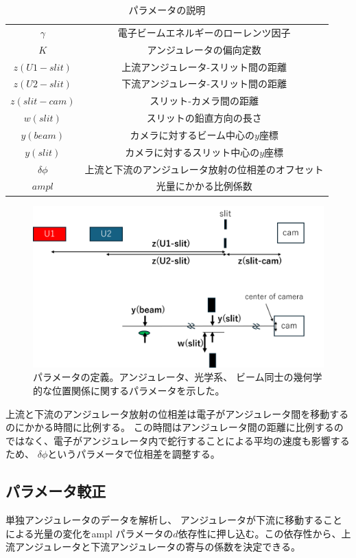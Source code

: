 \documentclass[a4paper,11pt,uplatex]{jsbook}
\begin{document}
\begin{table}[h]
\centering
\begin{tabular}{c|c}
  $\gamma$ & 電子ビームエネルギーのローレンツ因子 \\
  $K$ & アンジュレータの偏向定数 \\
  $z(U1-slit)$ & 上流アンジュレータ-スリット間の距離\\
  $z(U2-slit)$ & 下流アンジュレータ-スリット間の距離 \\
  $z(slit-cam)$ & スリット-カメラ間の距離 \\
  $w(slit)$ & スリットの鉛直方向の長さ \\
  $y(beam)$ & カメラに対するビーム中心の$y$座標 \\
  $y(slit)$ & カメラに対するスリット中心の$y$座標 \\
  $\delta \phi$ & 上流と下流のアンジュレータ放射の位相差のオフセット\\
  $ampl$ & 光量にかかる比例係数
\end{tabular}
\caption[パラメータの説明]{パラメータの説明}\label{tab:prm}
\end{table}

\begin{figure}[h]
  \centering
  \includegraphics[width=0.8\linewidth]{image/4-prm.png}
  \caption[パラメータの定義]{パラメータの定義。アンジュレータ、光学系、
  ビーム同士の幾何学的な位置関係に関するパラメータを示した。}\label{prm}
\end{figure}
上流と下流のアンジュレータ放射の位相差は電子がアンジュレータ間を移動するのにかかる時間に比例する。
この時間はアンジュレータ間の距離に比例するのではなく、電子がアンジュレータ内で蛇行することによる平均の速度も影響するため、
$\delta \phi$というパラメータで位相差を調整する。


\subsection{パラメータ較正}
単独アンジュレータのデータを解析し、
アンジュレータが下流に移動することによる光量の変化をampl パラメータの$d$依存性に押し込む。この依存性から、上流アンジュレータと下流アンジュレータの寄与の係数を決定できる。
\end{document}

